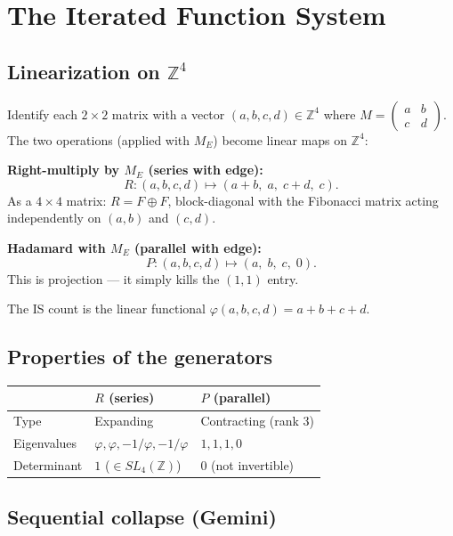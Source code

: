 \documentclass[11pt,a4paper]{article}
\theoremstyle{definition}
\theoremstyle{remark}
\newcommand{\ZZ}{\mathbb{Z}}
\begin{document}
\section{The Iterated Function System}

\subsection{Linearization on $\ZZ^4$}

Identify each $2\times 2$ matrix with a vector $(a,b,c,d) \in \ZZ^4$ where $M = \left(\begin{smallmatrix}a&b\\c&d\end{smallmatrix}\right)$. The two operations (applied with $M_E$) become linear maps on $\ZZ^4$:

\textbf{Right-multiply by $M_E$ (series with edge):}
\[
R: (a,b,c,d) \mapsto (a+b,\; a,\; c+d,\; c).
\]
As a $4 \times 4$ matrix: $R = F \oplus F$, block-diagonal with the Fibonacci matrix acting independently on $(a,b)$ and $(c,d)$.

\textbf{Hadamard with $M_E$ (parallel with edge):}
\[
P: (a,b,c,d) \mapsto (a,\; b,\; c,\; 0).
\]
This is projection --- it simply kills the $(1,1)$ entry.

The IS count is the linear functional $\varphi(a,b,c,d) = a+b+c+d$.

\subsection{Properties of the generators}

\begin{center}
\begin{tabular}{lll}
\toprule
 & $R$ (series) & $P$ (parallel) \\
\midrule
Type & Expanding & Contracting (rank 3) \\
Eigenvalues & $\varphi, \varphi, -1/\varphi, -1/\varphi$ & $1, 1, 1, 0$ \\
Determinant & $1$ ($\in SL_4(\ZZ)$) & $0$ (not invertible) \\
\bottomrule
\end{tabular}
\end{center}

\subsection{Sequential collapse (Gemini)}
\end{document}
